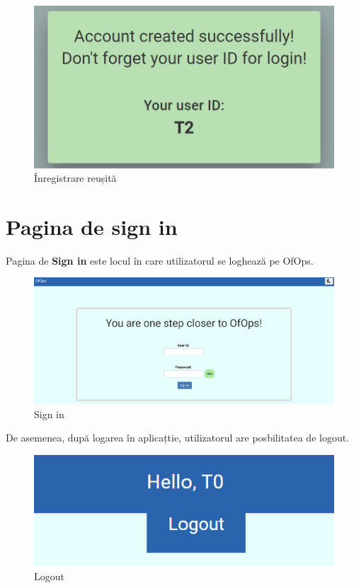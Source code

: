 \begin{figure}[!htb]
    \centering
    \includegraphics[width=0.9\linewidth]{images/autentf.png}
    \caption{Înregistrare reușită}
    \label{fig:autentf}
\end{figure}

\section{Pagina de sign in}
Pagina de \textbf{Sign in} este locul în care utilizatorul se loghează pe OfOps. 

\begin{figure}[!htb]
    \centering
    \includegraphics[width=0.9\linewidth]{images/signin.png}
    \caption{Sign in}
    \label{fig:signin}
\end{figure}

\newpage

De asemenea, după logarea în aplicațtie, utilizatorul are posbilitatea de logout.

\begin{figure}[!htb]
    \centering
    \includegraphics[width=0.9\linewidth]{images/logout.png}
    \caption{Logout}
    \label{fig:logout}
\end{figure}

